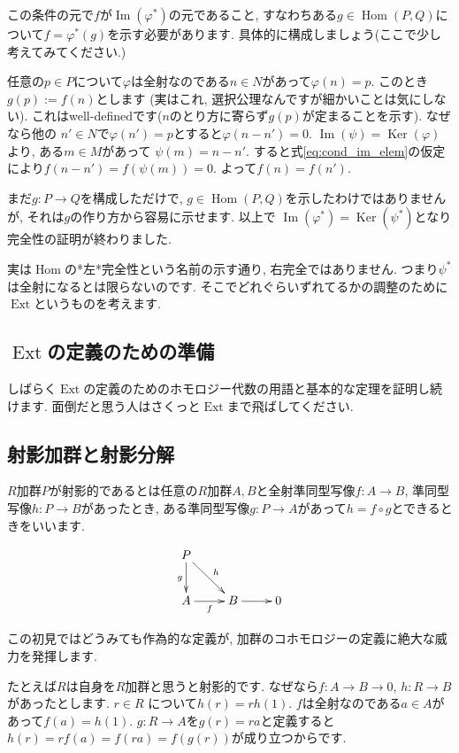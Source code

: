 \documentclass{jsarticle}
\newcommand{\makeop}[1]{\mathop{\mathrm{#1}}\nolimits}
\def\Im{\makeop{Im}}
\def\Ker{\makeop{Ker}}
\def\Hom{\makeop{Hom}}
\def\Ext{\makeop{Ext}}
\theoremstyle{definition}
\numberwithin{theorem}{section}
\begin{document}
この条件の元で$f$が$\Im(\varphi^*)$の元であること, すなわちある$g\in\Hom(P, Q)$について$f = \varphi^*(g)$を示す必要があります. 具体的に構成しましょう(ここで少し考えてみてください.)

任意の$p\in P$について$\varphi$は全射なのである$n\in N$があって$\varphi(n) = p$. このとき$g(p) := f(n)$とします
(実はこれ, 選択公理なんですが細かいことは気にしない). これはwell-definedです($n$のとり方に寄らず$g(p)$が定まることを示す). なぜなら他の
$n'\in N$で$\varphi(n') = p$とすると$\varphi(n-n') = 0$. $\Im(\psi) = \Ker(\varphi)$より, ある$m\in M$があって
$\psi(m) = n-n'$. すると式\ref{eq:cond_im_elem}の仮定により$f(n-n') = f(\psi(m)) = 0$. よって$f(n) = f(n')$.

まだ$g: P\rightarrow Q$を構成しただけで, $g\in\Hom(P, Q)$を示したわけではありませんが, それは$g$の作り方から容易に示せます. 以上で
$\Im(\varphi^*) = \Ker(\psi^*)$となり完全性の証明が終わりました.

実は$\Hom$の*左*完全性という名前の示す通り, 右完全ではありません. つまり$\psi^*$は全射になるとは限らないのです. そこでどれぐらいずれてるかの調整のために$\Ext$というものを考えます.

\subsection{$\Ext$の定義のための準備}
しばらく$\Ext$の定義のためのホモロジー代数の用語と基本的な定理を証明し続けます. 面倒だと思う人はさくっと$\Ext$まで飛ばしてください.

\subsection{射影加群と射影分解}
\label{sc:proj_module}
$R$加群$P$が射影的であるとは任意の$R$加群$A, B$と全射準同型写像$f: A\rightarrow B$, 準同型写像$h: P\rightarrow B$があったとき,
ある準同型写像$g: P\rightarrow A$があって$h = f\circ g$とできるときをいいます.

\begin{equation*}
\xymatrix{
  P \ar[dr]^h \ar[d]_g & \\
  A \ar[r]_f & B \ar[r] & 0
}
\end{equation*}

この初見ではどうみても作為的な定義が, 加群のコホモロジーの定義に絶大な威力を発揮します.

たとえば$R$は自身を$R$加群と思うと射影的です. なぜなら$f: A\rightarrow B\rightarrow 0$, $h: R \rightarrow B$があったとします.
$r\in R$ について$h(r) = rh(1)$. $f$は全射なのである$a\in A$があって$f(a) = h(1)$. $g:R \rightarrow A$を$g(r) = ra$と定義すると
$h(r) = rf(a) = f(ra) = f(g(r))$が成り立つからです.
\end{document}
